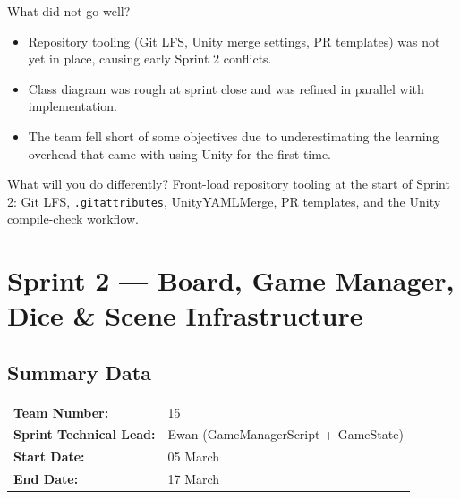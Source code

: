What did not go well?
\begin{itemize}
    \item Repository tooling (Git LFS, Unity merge settings, PR templates) was not yet in place, causing early Sprint 2 conflicts.
    \item Class diagram was rough at sprint close and was refined in parallel with implementation.
    \item The team fell short of some objectives due to underestimating the learning overhead that came with using Unity for the first time.
\end{itemize}

What will you do differently? Front-load repository tooling at the start of Sprint 2: Git LFS, \texttt{.gitattributes}, UnityYAMLMerge, PR templates, and the Unity compile-check workflow.

\section{Sprint 2 --- Board, Game Manager, Dice \& Scene Infrastructure}
\label{sec:sprint2}

\subsection*{Summary Data}
\begin{tabular}{ll}
\textbf{Team Number:} & 15 \\
\textbf{Sprint Technical Lead:} & Ewan (GameManagerScript + GameState) \\
\textbf{Start Date:} & 05 March \\
\textbf{End Date:} & 17 March \\
\end{tabular}

